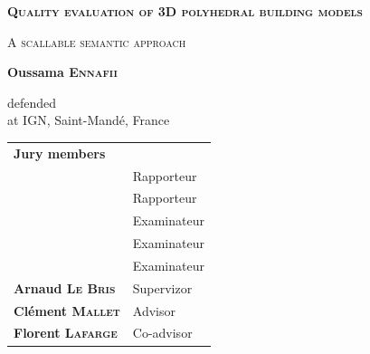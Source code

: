 \begin{titlepage}
\begin{center}
        \begin{Large}
            \textsc{\textbf{Quality evaluation of 3D polyhedral building models}}\\
        \end{Large}
        \vspace*{2.5mm}
        \begin{large}
            \textsc{A scallable semantic approach}
        \end{large}

        \vspace*{10mm}

        \begin{large}
            \textbf{Oussama \textsc{Ennafii}}
        \end{large}

        \vspace*{10mm}

        defended  \\
        at IGN, Saint-Mand\'e, France

        \vspace*{20mm}

        \begin{tabular}{l l}
            \large \textbf{Jury members} & \\
            & Rapporteur \\
            & Rapporteur \\
            & Examinateur \\
            & Examinateur \\
            & Examinateur \\
            \textbf{Arnaud \textsc{Le Bris}} & Supervizor \\
            \textbf{Clément \textsc{Mallet}} & Advisor \\
            \textbf{Florent \textsc{Lafarge}} & Co-advisor \\
        \end{tabular}
    \end{center}
\end{titlepage}
